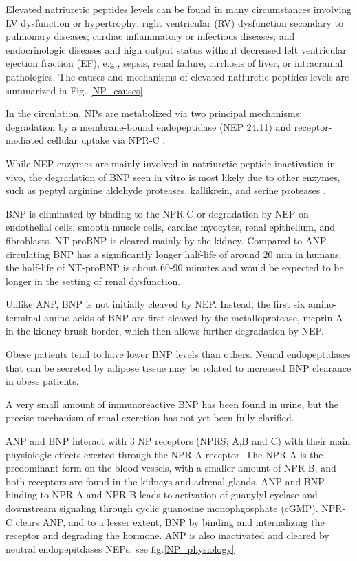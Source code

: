 \documentclass[14pt,a4paper,onecolumn]{extarticle}
\begin{document}
Elevated natriuretic peptides levels can be found in many circumstances involving LV dysfunction or hypertrophy; right ventricular (RV) dysfunction secondary to pulmonary diseases; cardiac inflammatory or infectious diseases; and endocrinologic diseases and high output status without decreased left ventricular ejection fraction (EF), e.g., sepsis, renal failure, cirrhosis of liver, or intracranial pathologies. The causes and mechanisms of elevated natiuretic peptides levels are summarized in Fig. \ref{NP_causes}. %

In the circulation, NPs are metabolized via two principal mechanisms: degradation by a membrane-bound endopeptidase (NEP 24.11) and receptor-mediated cellular uptake via NPR-C \citep{14}. %

While NEP enzymes are mainly involved in natriuretic peptide inactivation in vivo, the degradation of BNP seen in vitro is most likely due to other enzymes, such as peptyl arginine aldehyde proteases, kallikrein, and serine proteases \citep{15}. %

BNP is eliminated by binding to the NPR-C or degradation by NEP on endothelial cells, smooth muscle cells, cardiac myocytes, renal epithelium, and fibroblasts. NT-proBNP is cleared mainly by the kidney. Compared to ANP, circulating BNP has a significantly longer half-life of around 20 min in humans; the half-life of NT-proBNP is about 60-90 minutes and would be expected to be longer in the setting of renal dysfunction. \citep{Pankow2007}

Unlike ANP, BNP is not initially cleaved by NEP. Instead, the first six amino-terminal amino acids of BNP are first cleaved by the metalloprotease, meprin A in the kidney brush border, which then allows further degradation by NEP. \citep{Pankow2007}

Obese patients tend to have lower BNP levels than others. Neural endopeptidases that can be secreted by adipose tissue may be related to increased BNP clearance in obese patients. \citep{Yang2004} %

A very small amount of immunoreactive BNP has been found in urine, but the precise mechanism of renal excretion has not yet been fully clarified. \citep{203} %

ANP and BNP interact with 3 NP receptors (NPRS; A,B and C)  with their main physiologic effects exerted through the NPR-A receptor.  The NPR-A is the predominant form on the blood vessels, with a smaller amount of NPR-B, and both receptors are found in the kidneys and adrenal glands.  ANP and BNP binding to NPR-A and NPR-B leads to activation of guanylyl cyclase and downstream signaling through cyclic guanosine monophgosphate (cGMP).  NPR-C clears ANP, and to a lesser extent, BNP by binding and internalizing the receptor and degrading the hormone.  ANP is also inactivated and cleared by neutral endopepitdases NEPs. see fig.\ref{NP_physiology} \citep{Maisel2018} %
\end{document}
